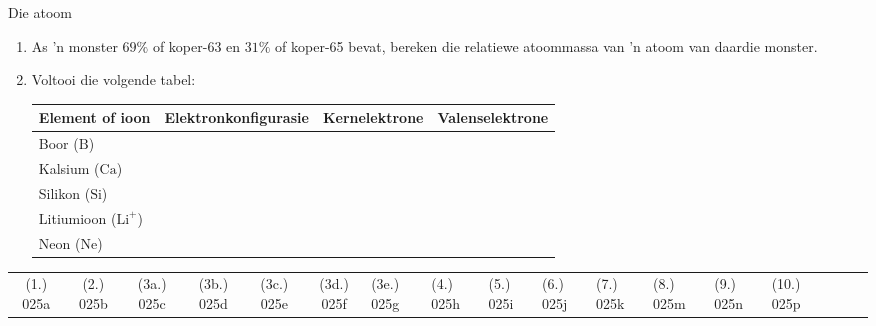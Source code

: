 \begin{eocexercises}{Die atoom}
\begin{enumerate}[noitemsep, label=\textbf{\arabic*}. ]
\item As 'n monster $69\%$ of koper-63 en $31\%$ of koper-65 bevat, bereken die relatiewe atoommassa van 'n atoom van daardie monster.
            \item Voltooi die volgende tabel:
          \begin{table}[H]
        \begin{center}
      
    \noindent
      \begin{tabular}{|l|l|l|l|}\hline
        Element of ioon &
        Elektronkonfigurasie &
        Kernelektrone &
        Valenselektrone \\ \hline
        Boor ($\text{B}$) &
         &
         &
       \\ \hline
        Kalsium ($\text{Ca}$) &
         &
         &
     \\ \hline
        Silikon ($\text{Si}$) &
         &
         &
       \\ \hline
        Litiumioon ($\text{Li}^{+}$) &
         &
         &
      \\ \hline
        Neon ($\text{Ne}$) &
         &
         &
     \\ \hline
    \end{tabular}
      \end{center}
\end{table}
    \par
\end{enumerate}

\practiceinfo
\begin{tabular}[h]{cccccc}
 (1.) 025a  &  (2.) 025b  &  (3a.) 025c  &  (3b.) 025d  &  (3c.) 025e  &  (3d.) 025f  &  (3e.) 025g  &  (4.) 025h  &  (5.) 025i  &  (6.) 025j  &  (7.) 025k  &  (8.) 025m  &  (9.) 025n  &  (10.) 025p  &  & &  &
\end{tabular}

\end{eocexercises}
